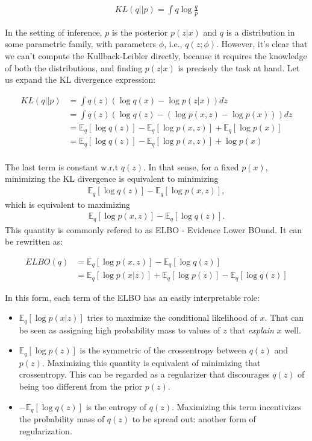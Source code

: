\begin{align}
    KL(q||p) = \int q \log\frac{q}{p}
\end{align}

In the setting of inference, $p$ is the posterior $p(z|x)$ and $q$ is a distribution
in some parametric family, with parameters $\phi$, i.e., $q(z; \phi)$. However,
it's clear that we can't compute the Kullback-Leibler directly, because it
requires the knowledge of both the distributions, and finding $p(z|x)$ is precisely
the task at hand. Let us expand the KL divergence expression:

\begin{align}
    KL(q||p) &= \int q(z) (\log q(x) - \log p(z|x)) dz \\
             &= \int q(z) (\log q(z) - (\log p(x, z) - \log p(x))) dz \\
             &= \mathbb{E}_q [\log q(z)] - \mathbb{E}_q [\log p(x, z)] + \mathbb{E}_q [\log p(x)] \\
             &= \mathbb{E}_q [\log q(z)] - \mathbb{E}_q [\log p(x, z)] + \log p(x) \\
\end{align}

The last term is constant w.r.t $q(z)$. In that sense, for a fixed $p(x)$,
minimizing the KL divergence is equivalent to minimizing
\begin{align}
    \mathbb{E}_q [\log q(z)] - \mathbb{E}_q [\log p(x, z)],
\end{align} which is equivalent to maximizing
\begin{align}
    \mathbb{E}_q [\log p(x, z)] - \mathbb{E}_q [\log q(z)]. \label{eq:elbokldiv}
\end{align} This quantity is commonly refered to as ELBO - Evidence Lower BOund.
It can be rewritten as:

\begin{align}
    ELBO(q) &= \mathbb{E}_q [\log p(x, z)] - \mathbb{E}_q [\log q(z)] \\
            &= \mathbb{E}_q [\log p(x|z)] + \mathbb{E}_q [\log p(z)] - \mathbb{E}_q [\log q(z)]
\end{align}

In this form, each term of the ELBO has an easily interpretable role:
\begin{itemize}
    \item $\mathbb{E}_q [\log p(x|z)]$ tries to maximize the conditional likelihood of $x$. That
        can be seen as assigning high probability mass to values of $z$ that \emph{explain} $x$
        well.
    \item $\mathbb{E}_q [\log p(z)]$ is the symmetric of the crossentropy between
        $q(z)$ and $p(z)$. Maximizing this quantity is equivalent of minimizing
        that crossentropy. This can be regarded as a regularizer that discourages
        $q(z)$ of being too different from the prior $p(z)$.
    \item $ - \mathbb{E}_q [\log q(z)]$ is the entropy of $q(z)$. Maximizing
        this term incentivizes the probability mass of $q(z)$ to be spread out:
        another form of regularization.
\end{itemize}

